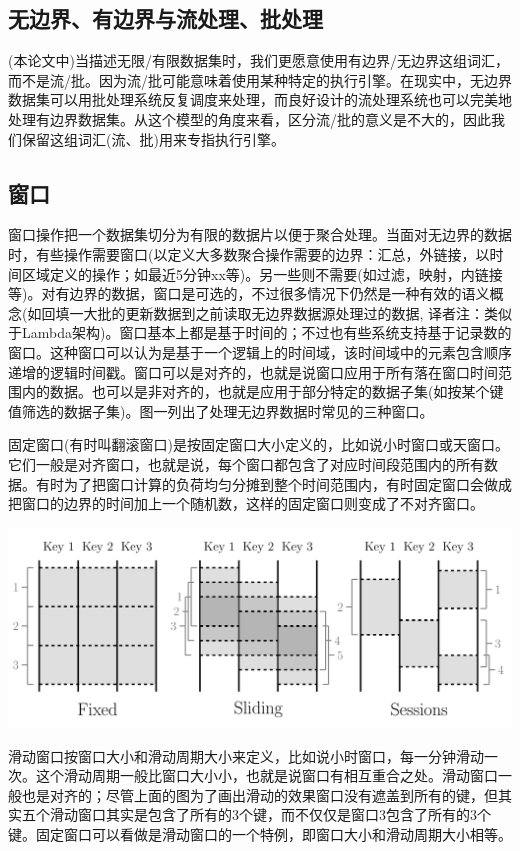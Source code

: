 \documentclass[oneside]{ctexbook}
\begin{document}
\subsection{无边界、有边界与流处理、批处理}

(本论文中)当描述无限/有限数据集时，我们更愿意使用有边界/无边界这组词汇，而不是流/批。因为流/批可能意味着使用某种特定的执行引擎。在现实中，无边界数据集可以用批处理系统反复调度来处理，而良好设计的流处理系统也可以完美地处理有边界数据集。从这个模型的角度来看，区分流/批的意义是不大的，因此我们保留这组词汇(流、批)用来专指执行引擎。

\subsection{窗口}

窗口操作把一个数据集切分为有限的数据片以便于聚合处理。当面对无边界的数据时，有些操作需要窗口(以定义大多数聚合操作需要的边界：汇总，外链接，以时间区域定义的操作；如最近5分钟xx等)。另一些则不需要(如过滤，映射，内链接等)。对有边界的数据，窗口是可选的，不过很多情况下仍然是一种有效的语义概念(如回填一大批的更新数据到之前读取无边界数据源处理过的数据, 译者注：类似于Lambda架构)。窗口基本上都是基于时间的；不过也有些系统支持基于记录数的窗口。这种窗口可以认为是基于一个逻辑上的时间域，该时间域中的元素包含顺序递增的逻辑时间戳。窗口可以是对齐的，也就是说窗口应用于所有落在窗口时间范围内的数据。也可以是非对齐的，也就是应用于部分特定的数据子集(如按某个键值筛选的数据子集)。图一列出了处理无边界数据时常见的三种窗口。

固定窗口(有时叫翻滚窗口)是按固定窗口大小定义的，比如说小时窗口或天窗口。它们一般是对齐窗口，也就是说，每个窗口都包含了对应时间段范围内的所有数据。有时为了把窗口计算的负荷均匀分摊到整个时间范围内，有时固定窗口会做成把窗口的边界的时间加上一个随机数，这样的固定窗口则变成了不对齐窗口。

\noindent \includegraphics[width=\textwidth]{windowpattern.png}

滑动窗口按窗口大小和滑动周期大小来定义，比如说小时窗口，每一分钟滑动一次。这个滑动周期一般比窗口大小小，也就是说窗口有相互重合之处。滑动窗口一般也是对齐的；尽管上面的图为了画出滑动的效果窗口没有遮盖到所有的键，但其实五个滑动窗口其实是包含了所有的3个键，而不仅仅是窗口3包含了所有的3个键。固定窗口可以看做是滑动窗口的一个特例，即窗口大小和滑动周期大小相等。
\end{document}

